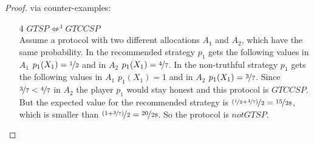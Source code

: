 \begin{proof}{via counter-examples:}
\begin{enumerate}
\item[4] $GTSP \not\Leftarrow^{4} GTCCSP$\\
Assume a protocol with two different allocations $A_1$ and $A_2$, which have the same probability. In the recommended strategy $p_1$ gets the following values in $A_1$ $p_1(X_1)=\nicefrac{1}{2}$ and in $A_2$ $p_1(X_1)=\nicefrac{4}{7}$. In the non-truthful strategy $p_1$ gets the following values in $A_1$ $p_1(X_1)=1$ and in $A_2$ $p_1(X_1)=\nicefrac{3}{7}$. Since $\nicefrac{3}{7} < \nicefrac{4}{7}$ in $A_2$ the player $p_1$ would stay honest and this protocol is $GTCCSP$. But the expected value for the recommended strategy is $\nicefrac{(\nicefrac{1}{2}+\nicefrac{4}{7})}{2}=\nicefrac{15}{28}$, which is smaller than $\nicefrac{(1+\nicefrac{3}{7})}{2}=\nicefrac{20}{28}$. So the protocol is $notGTSP$. 
\end{enumerate}
\end{proof}


